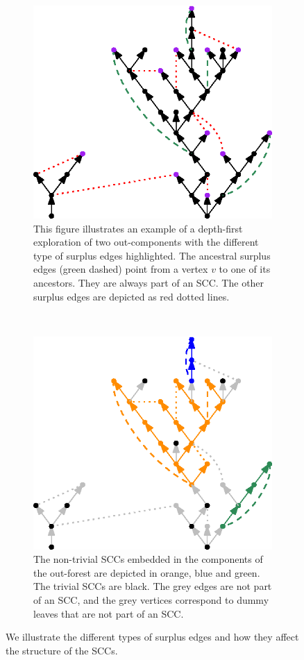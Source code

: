 \begin{figure}
\centering
\begin{subfigure}{0.7\textwidth}
 \centering
    \includegraphics[width=0.7\linewidth]{Content/Pictures/types_of_surplus_edges.eps}
    \caption{This figure illustrates an example of a depth-first exploration of two out-components with the different type of surplus edges highlighted. The ancestral surplus edges (green dashed) point from a vertex $v$ to one of its ancestors. They are always part of an SCC. The other surplus edges are depicted as red dotted lines.}
    \label{subfigure.typesofsurplusedges} 
\end{subfigure}\\
\begin{subfigure}{0.7\textwidth}
  \centering
  \includegraphics[width=0.7\linewidth]{Content/Pictures/sccs_in_example.eps}
  \caption{The non-trivial SCCs embedded in the components of the out-forest are depicted in orange, blue and green. The trivial SCCs are black. The grey edges are not part of an SCC, and the grey vertices correspond to dummy leaves that are not part of an SCC.}
    \label{subfigure.sccinexample}
\end{subfigure}
\caption{We illustrate the different types of surplus edges and how they affect the structure of the SCCs.}
\end{figure}

